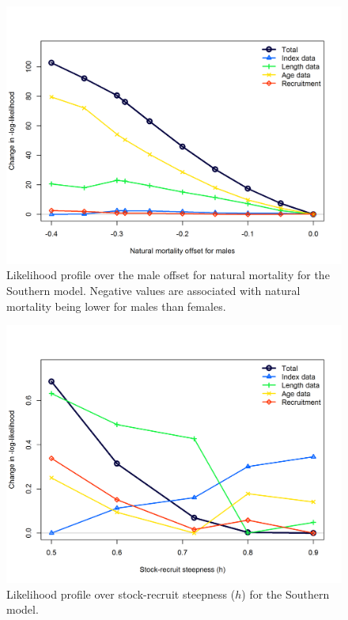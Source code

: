 \documentclass[12pt,]{article}
\begin{document}
\FloatBarrier

\begin{figure}[htbp]
\centering
\includegraphics{Figures/profiles/profile_M2.S.png}
\caption{Likelihood profile over the male offset for natural mortality
for the Southern model. Negative values are associated with natural
mortality being lower for males than females.\label{fig:profile_M2.S}}
\end{figure}

\FloatBarrier

\begin{figure}[htbp]
\centering
\includegraphics{Figures/profiles/profile_h.S.png}
\caption{Likelihood profile over stock-recruit steepness (\(h\)) for the
Southern model. \label{fig:profile_h.S}}
\end{figure}
\end{document}
